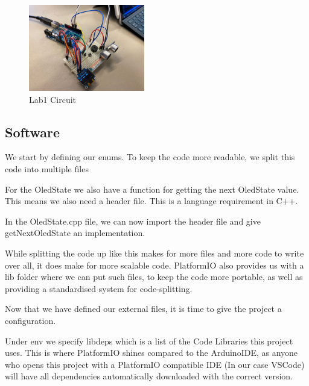 \documentclass[journal]{IEEEtran}
\begin{document}
\begin{figure}[H]%
    \begin {center}
    \includegraphics[width=0.45\textwidth]{images/lab1-image.jpg}
    \caption{Lab1 Circuit}
    \label{fig:circuitPicture}
    \end {center}
\end{figure}

\vfill\null
\pagebreak

\subsection{Software}
We start by defining our enums. To keep the code more readable, we split this code into multiple files

For the OledState we also have a function for getting the next OledState value.
This means we also need a header file. This is a language requirement in C++.

In the OledState.cpp file, we can now import the header file and give getNextOledState an implementation.

While splitting the code up like this makes for more files and more code to write over all,
it does make for more scalable code. PlatformIO also provides us with a lib folder where we can put such files,
to keep the code more portable,
as well as providing a standardised system for code-splitting.

\vfill\null
\pagebreak

Now that we have defined our external files,
it is time to give the project a configuration.

Under env we specify lib\textunderscore deps which is a list of the Code Libraries this project
uses. This is where PlatformIO shines compared to the ArduinoIDE, as anyone who opens
this project with a PlatformIO compatible IDE (In our case VSCode) will have all dependencies
automatically downloaded with the correct version.\\
\end{document}
